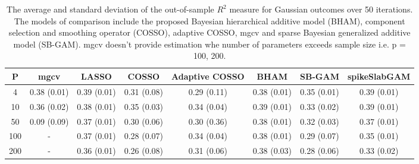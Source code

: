 \begin{table}[ht]
\centering
\begin{tabular}{cccccccc}
  \hline
P & mgcv & LASSO & COSSO & Adaptive COSSO & BHAM & SB-GAM & spikeSlabGAM \\ 
  \hline
  4 & 0.38 (0.01) & 0.39 (0.01) & 0.31 (0.08) & 0.29 (0.11) & 0.38 (0.01) & 0.35 (0.01) & 0.39 (0.01) \\ 
   10 & 0.36 (0.02) & 0.38 (0.01) & 0.35 (0.03) & 0.34 (0.04) & 0.39 (0.01) & 0.33 (0.02) & 0.39 (0.01) \\ 
   50 & 0.09 (0.09) & 0.37 (0.01) & 0.30 (0.06) & 0.30 (0.36) & 0.38 (0.01) & 0.32 (0.03) & 0.37 (0.01) \\ 
  100 & - & 0.37 (0.01) & 0.28 (0.07) & 0.34 (0.04) & 0.38 (0.01) & 0.29 (0.07) & 0.35 (0.01) \\ 
  200 & - & 0.36 (0.01) & 0.26 (0.08) & 0.31 (0.06) & 0.38 (0.03) & 0.28 (0.06) & 0.33 (0.02) \\ 
   \hline
\end{tabular}
\caption{The average and standard deviation of the out-of-sample $R^2$ measure for
    Gaussian outcomes over 50 iterations. The models of comparison include the proposed Bayesian
    hierarchical additive model (BHAM), component selection and smoothing operator (COSSO), adaptive
    COSSO, mgcv and sparse Bayesian generalized additive model (SB-GAM). mgcv doesn't provide estimation
    whe number of parameters exceeds sample size i.e. p = 100, 200.} 
\label{tab:lnr_gaus}
\end{table}
